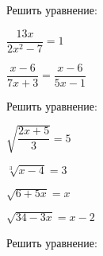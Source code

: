 \begin{listofex}
	\item Решить уравнение:
	\begin{enumcols}[itemcolumns=2]
		\item \( \dfrac{13x}{2x^2-7}=1 \) 
		\item \( \dfrac{x-6}{7x+3}=\dfrac{x-6}{5x-1} \) 
		\item {}
		\item {}
	\end{enumcols}
	\item Решить уравнение:
	\begin{enumcols}[itemcolumns=2]
		\item \( \sqrt{\dfrac{2x+5}{3}}=5 \) 
		\item \( \sqrt[3]{x-4}=3 \) 
		\item \( \sqrt{6+5x}=x \) 
		\item \( \sqrt{34-3x}=x-2 \) 
		\item {}
		\item {}
	\end{enumcols}
	\item Решить уравнение:
	\begin{enumcols}[itemcolumns=2]
		\item {}
		\item {}
		\item {}
		\item {}
		\item {}
		\item {}
	\end{enumcols}
\end{listofex}
